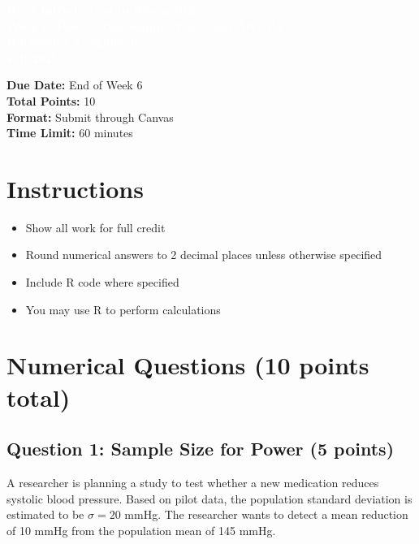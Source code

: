 \documentclass[11pt]{article}
\title{}
\author{}
\date{}
\begin{document}
\begin{tcolorbox}[colback=osaorange,colframe=black,boxrule=2pt,arc=0pt,left=3pt,right=3pt,top=6pt,bottom=6pt,boxsep=2pt]
\centering
\textcolor{white}{\textbf{\Large H524 Introduction to Biostatistics}}\\
\textcolor{white}{\textbf{\Large Week 6: Power, Two-Sample Tests, and ANOVA}}\\
\textcolor{white}{\textbf{\Large Homework Assignment}}\\
\textcolor{white}{\textbf{\Large Fall 2025}}
\end{tcolorbox}

\vspace{8pt}

\noindent\textbf{Due Date:} End of Week 6\\
\textbf{Total Points:} 10\\
\textbf{Format:} Submit through Canvas\\
\textbf{Time Limit:} 60 minutes

\section*{Instructions}

\begin{itemize}
\item Show all work for full credit
\item Round numerical answers to 2 decimal places unless otherwise specified
\item Include R code where specified
\item You may use R to perform calculations
\end{itemize}

\section{Numerical Questions (10 points total)}

\subsection*{Question 1: Sample Size for Power (5 points)}

A researcher is planning a study to test whether a new medication reduces systolic blood pressure. Based on pilot data, the population standard deviation is estimated to be $\sigma = 20$ mmHg. The researcher wants to detect a mean reduction of 10 mmHg from the population mean of 145 mmHg.
\end{document}
